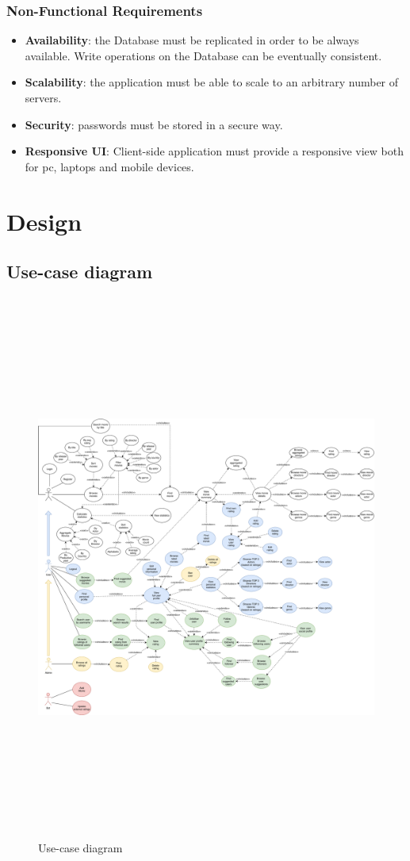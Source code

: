 \documentclass[11pt]{article}
\begin{document}
\subsubsection{Non-Functional Requirements}
\begin{itemize}
	\item \textbf{Availability}: the Database must be replicated in order to be always available. Write operations on the Database can be eventually consistent.
	\item \textbf{Scalability}: the application must be able to scale to an arbitrary number of servers.
	\item \textbf{Security}: passwords must be stored in a secure way.
	\item \textbf{Responsive UI}: Client-side application must provide a responsive view both for pc, 
	laptops and mobile devices.
\end{itemize}

\section{Design}

\subsection{Use-case diagram}

\begin{figure}
    \centering
    \includegraphics[height=18cm]{figs/use_case.pdf}
    \caption{Use-case diagram}
    \label{fig:usecase}
\end{figure}
\end{document}
